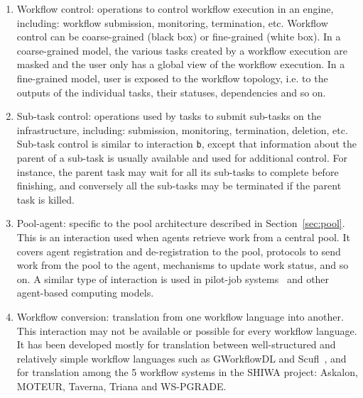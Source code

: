 \documentclass[preprint,3p,twocolumn]{elsarticle}
\newcommand{\note}[2]{\pdfmargincomment[color=yellow,author=#1,open=true]{#2}}
\newcommand{\closednote}[4]{} %
\begin{document}
\begin{enumerate}[leftmargin=0cm,itemindent=0.65cm,label=\texttt{(\alph*)}]
{    And I clearly see now that this is in fact the case in III, c is not differentiated. Closing this thread for good.}
  Tools and services such as JSAGA~\cite{reynaud2010uniform} or Data Avenue~\cite{hajnal2014data}
  can be used to homogeneize these interfaces.
\item Workflow control: operations to control workflow execution in an
  engine, including: workflow submission, monitoring, termination,
  etc. Workflow control can be coarse-grained (black box) or
  fine-grained (white box). In a coarse-grained model, the various
  tasks created by a workflow execution are masked and the user only
  has a global view of the workflow execution. In a fine-grained
  model, user is exposed to the workflow topology, i.e. to the outputs
  of the individual tasks, their statuses, dependencies and so on.
\item Sub-task control: operations used by tasks to submit sub-tasks
  on the infrastructure, including: submission, monitoring,
  termination, deletion, etc. Sub-task control is similar to
  interaction \texttt{b}, except that information about the parent
  of a sub-task is usually available and used for
  additional control. For instance, the parent task may wait for all
  its sub-tasks to complete before finishing, and conversely all the
  sub-tasks may be terminated if the parent task is killed.
\item Pool-agent: specific to the pool architecture described in
  Section~\ref{sec:pool}. This is an interaction used when agents
  retrieve work from a central pool. It covers agent registration and
  de-registration to the pool, protocols to send work from the pool to
  the agent, mechanisms to update work status, and so on. A similar
  type of interaction is used in pilot-job
  systems~\cite{turilli2015comprehensive} and other agent-based
  computing models.
\item Workflow conversion: translation from one workflow language into
  another. This interaction may not be available or possible for every
  workflow language. It has been developed mostly for translation
  between well-structured and relatively simple workflow languages
  such as GWorkflowDL and Scufl~\cite{OLAB-09}, and for translation
  among the 5 workflow systems in the SHIWA project: Askalon, MOTEUR,
  Taverna, Triana and WS-PGRADE.  \closednote{Silvia}{Should we add here the
    4?  and for translation among the 5 workflow systems in the SHIWA
    project: Askalon, MOTEUR, Taverna, Triana and WS-PGRADE)}{Tristan}{Yes, done!}
\end{enumerate}
\end{document}
